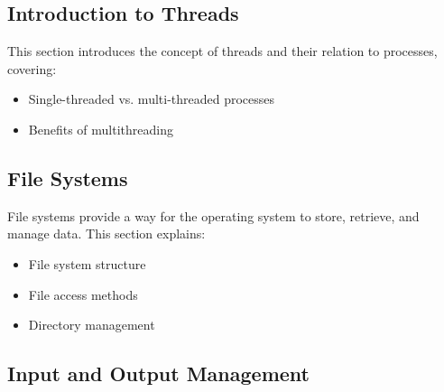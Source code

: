 \documentclass[12pt]{article}
\begin{document}
\subsection{Introduction to Threads}
This section introduces the concept of threads and their relation to processes, covering:
\begin{itemize}
    \item Single-threaded vs. multi-threaded processes
    \item Benefits of multithreading
\end{itemize}

\subsection{File Systems}
File systems provide a way for the operating system to store, retrieve, and manage data. This section explains:
\begin{itemize}
    \item File system structure
    \item File access methods
    \item Directory management
\end{itemize}

\subsection{Input and Output Management}
\end{document}

